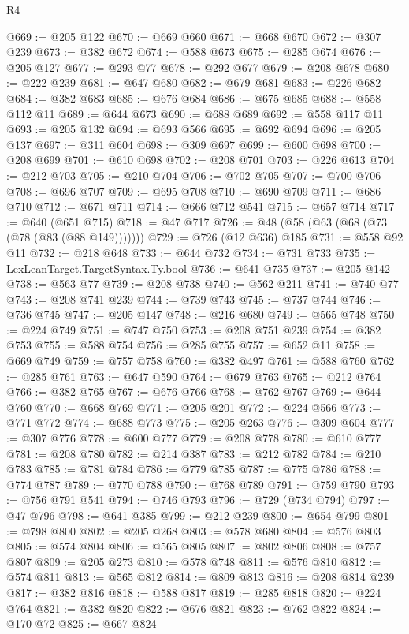 \begin{lexlean}{R4}
\begin{coremodule}
@669 := @205 @122
@670 := @669 @660
@671 := @668 @670
@672 := @307 @239
@673 := @382 @672
@674 := @588 @673
@675 := @285 @674
@676 := @205 @127
@677 := @293 @77
@678 := @292 @677
@679 := @208 @678
@680 := @222 @239
@681 := @647 @680
@682 := @679 @681
@683 := @226 @682
@684 := @382 @683
@685 := @676 @684
@686 := @675 @685
@688 := @558 @112 @11
@689 := @644 @673
@690 := @688 @689
@692 := @558 @117 @11
@693 := @205 @132
@694 := @693 @566
@695 := @692 @694
@696 := @205 @137
@697 := @311 @604
@698 := @309 @697
@699 := @600 @698
@700 := @208 @699
@701 := @610 @698
@702 := @208 @701
@703 := @226 @613
@704 := @212 @703
@705 := @210 @704
@706 := @702 @705
@707 := @700 @706
@708 := @696 @707
@709 := @695 @708
@710 := @690 @709
@711 := @686 @710
@712 := @671 @711
@714 := @666 @712 @541
@715 := @657 @714
@717 := @640 (@651 @715)
@718 := @47 @717
@726 := @48 (@58 (@63 (@68 (@73 (@78 (@83 (@88 @149)))))))
@729 := @726 (@12 @636) @185
@731 := @558 @92 @11
@732 := @218 @648
@733 := @644 @732
@734 := @731 @733
@735 := LexLeanTarget.TargetSyntax.Ty.bool
@736 := @641 @735
@737 := @205 @142
@738 := @563 @77
@739 := @208 @738
@740 := @562 @211
@741 := @740 @77
@743 := @208 @741 @239
@744 := @739 @743
@745 := @737 @744
@746 := @736 @745
@747 := @205 @147
@748 := @216 @680
@749 := @565 @748
@750 := @224 @749
@751 := @747 @750
@753 := @208 @751 @239
@754 := @382 @753
@755 := @588 @754
@756 := @285 @755
@757 := @652 @11
@758 := @669 @749
@759 := @757 @758
@760 := @382 @497
@761 := @588 @760
@762 := @285 @761
@763 := @647 @590
@764 := @679 @763
@765 := @212 @764
@766 := @382 @765
@767 := @676 @766
@768 := @762 @767
@769 := @644 @760
@770 := @668 @769
@771 := @205 @201
@772 := @224 @566
@773 := @771 @772
@774 := @688 @773
@775 := @205 @263
@776 := @309 @604
@777 := @307 @776
@778 := @600 @777
@779 := @208 @778
@780 := @610 @777
@781 := @208 @780
@782 := @214 @387
@783 := @212 @782
@784 := @210 @783
@785 := @781 @784
@786 := @779 @785
@787 := @775 @786
@788 := @774 @787
@789 := @770 @788
@790 := @768 @789
@791 := @759 @790
@793 := @756 @791 @541
@794 := @746 @793
@796 := @729 (@734 @794)
@797 := @47 @796
@798 := @641 @385
@799 := @212 @239
@800 := @654 @799
@801 := @798 @800
@802 := @205 @268
@803 := @578 @680
@804 := @576 @803
@805 := @574 @804
@806 := @565 @805
@807 := @802 @806
@808 := @757 @807
@809 := @205 @273
@810 := @578 @748
@811 := @576 @810
@812 := @574 @811
@813 := @565 @812
@814 := @809 @813
@816 := @208 @814 @239
@817 := @382 @816
@818 := @588 @817
@819 := @285 @818
@820 := @224 @764
@821 := @382 @820
@822 := @676 @821
@823 := @762 @822
@824 := @170 @72
@825 := @667 @824

\end{coremodule}
\end{lexlean}

